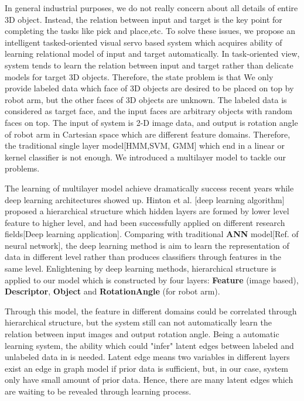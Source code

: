 \documentclass[journal]{IEEEtran}
\begin{document}
In general industrial purposes, we do not really concern about all details of entire 3D object. Instead, the relation between input and target is the key point for completing the tasks like pick and place,etc. To solve these issues, we propose an intelligent tasked-oriented visual servo based system which acquires ability of learning relational model of input and target automatically. In task-oriented view, system tends to learn the relation between input and target rather than delicate models for target 3D objects. Therefore, the state problem is that We only provide labeled data which face of 3D objects are desired to be placed on top by robot arm, but the other faces of 3D objects are unknown. The labeled data is considered as target face, and the input faces are arbitrary objects with random faces on top. The input of system is 2-D image data, and output is rotation angle of robot arm in Cartesian space which are different feature domains. Therefore, the traditional single layer model[HMM,SVM, GMM] which end in a linear or kernel classifier is not enough. We introduced a multilayer model to tackle our problems. 

The learning of multilayer model achieve dramatically success recent years while deep learning architectures showed up. Hinton et al. [deep learning algorithm] proposed a hierarchical structure which hidden layers are formed by lower level feature to higher level, and had been successfully applied on different research fields[Deep learning application]. Comparing with traditional \textbf{ANN} model[Ref. of neural network], the deep learning method is aim to learn the representation of data in different level rather than produces classifiers through features in the same level. Enlightening by deep learning methods, hierarchical structure is applied to our model which is constructed by four layers: \textbf{Feature} (image based), \textbf{Descriptor}, \textbf{Object} and \textbf{RotationAngle} (for robot arm).

Through this model, the feature in different domains could be correlated through hierarchical structure, but the system still can not automatically learn the relation between input images and output rotation angle. Being a automatic learning system, the ability which could "infer" latent edges between labeled and unlabeled data in is needed. Latent edge means two variables in different layers exist an edge in graph model if prior data is sufficient, but, in our case, system only have small amount of prior data. Hence, there are many latent edges which are waiting to be revealed through learning process. 
\end{document}
